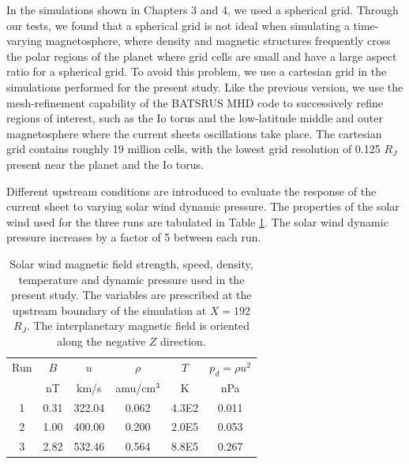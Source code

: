 In the simulations shown in Chapters 3 and 4, we used a spherical grid. Through our tests, we found that a spherical grid is not ideal when simulating a time-varying magnetosphere, where density and magnetic structures frequently cross the polar regions of the planet where grid cells are small and have a large aspect ratio for a spherical grid. To avoid this problem, we use a cartesian grid in the simulations performed for the present study. Like the previous version, we use the mesh-refinement capability of the BATSRUS MHD code to successively refine regions of interest, such as the Io torus and the low-latitude middle and outer magnetosphere where the current sheets oscillations take place. The cartesian grid contains roughly 19 million cells, with the lowest grid resolution of 0.125 $R_J$ present near the planet and the Io torus. 

Different upstream conditions are introduced to evaluate the response of the current sheet to varying solar wind dynamic pressure. The properties of the solar wind used for the three runs are tabulated in Table \ref{tab:sw-conditions-chp5}. The solar wind dynamic pressure increases by a factor of 5 between each run. 

\begin{table}
    \centering
    \begin{tabular}{c|c|c|c|c|c}

    Run  &$B$  &$u$  &$\rho$     &$T$  &$p_d=\rho u^2$\\
         &nT   &km/s &amu/cm$^3$ &K    &nPa\\
    \hline
    1    &0.31  &322.04  &0.062  &4.3E2  &0.011\\
    2    &1.00  &400.00  &0.200  &2.0E5  &0.053\\
    3    &2.82  &532.46  &0.564  &8.8E5  &0.267\\

    \end{tabular}
    \caption{Solar wind magnetic field strength, speed, density, temperature and dynamic pressure used in the present study. The variables are prescribed at the upstream boundary of the simulation at $X=192$ $R_J$. The interplanetary magnetic field is oriented along the negative $Z$ direction.}
    \label{tab:sw-conditions-chp5}
\end{table}

